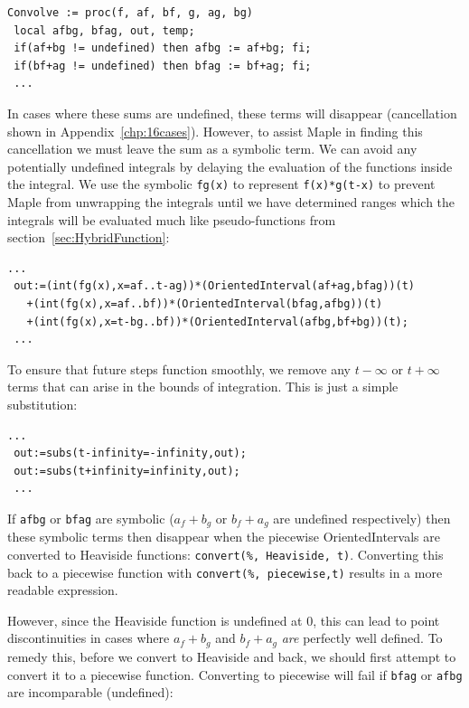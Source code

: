\begin{lstlisting}[frame=single]
Convolve := proc(f, af, bf, g, ag, bg)
 local afbg, bfag, out, temp;
 if(af+bg != undefined) then afbg := af+bg; fi;
 if(bf+ag != undefined) then bfag := bf+ag; fi;
 ...
\end{lstlisting}


In cases where these sums are undefined, these terms will disappear (cancellation shown in Appendix~\ref{chp:16cases}).
However, to assist Maple in finding this cancellation we must leave the sum as a symbolic term.
We can avoid any potentially undefined integrals by delaying the evaluation of the functions inside the integral.
We use the symbolic \texttt{fg(x)} to represent \texttt{f(x)*g(t-x)} to prevent Maple from unwrapping the integrals
until we have determined ranges which the integrals will be evaluated much like pseudo-functions from
 section~\ref{sec:HybridFunction}:


\begin{lstlisting}[frame=single]
 ...
 out:=(int(fg(x),x=af..t-ag))*(OrientedInterval(af+ag,bfag))(t)
   +(int(fg(x),x=af..bf))*(OrientedInterval(bfag,afbg))(t)
   +(int(fg(x),x=t-bg..bf))*(OrientedInterval(afbg,bf+bg))(t);
 ...
\end{lstlisting}


To ensure that future steps function smoothly, we remove any $t-\infty$ or $t+\infty$ terms that can arise in the 
bounds of integration.
This is just a simple substitution:

\pagebreak

\begin{lstlisting}[frame=single]
  ...
 out:=subs(t-infinity=-infinity,out);
 out:=subs(t+infinity=infinity,out);
 ...
\end{lstlisting}

If \texttt{afbg} or \texttt{bfag} are symbolic ($a_f+b_g$ or $b_f+a_g$ are undefined respectively) then
these symbolic terms then disappear when the piecewise OrientedIntervals are converted to Heaviside functions:
 \texttt{convert(\%, Heaviside, t)}.
Converting this back to a piecewise function with \texttt{convert(\%, piecewise,t)} results in a more readable expression.


However, since the Heaviside function is undefined at 0, this can lead to point discontinuities in cases where $a_f+b_g$ and
 $b_f+a_g$ \emph{are} perfectly well defined.
To remedy this, before we convert to Heaviside and back, we should first attempt to convert it to a piecewise function.
Converting to piecewise will fail if \texttt{bfag} or \texttt{afbg} are incomparable (undefined):


